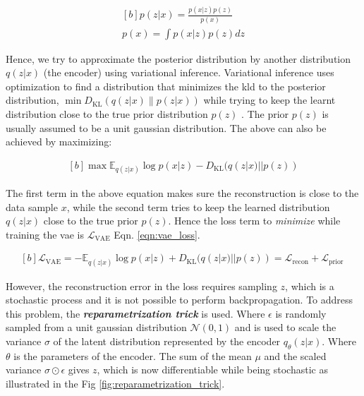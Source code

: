 \begin{equation}\label{eqn:pofx}
    \begin{gathered}[b]
        p(z | x)=\frac{p(x | z) p(z)}{p(x)} \\
        p(x)=\int p(x | z) p(z) dz
    \end{gathered}
\end{equation}

Hence, we try to approximate the posterior distribution by another distribution $q(z|x)$ (the encoder) using variational inference. Variational inference uses optimization to find a distribution that minimizes the \ac{kld} to the posterior distribution, $\min D_{\mathrm{KL}}(q(z| x) \| p(z| x))$ while trying to keep the learnt distribution close to the true prior distribution $p(z)$ \cite{variational_inference}. The prior $p(z)$ is usually assumed to be a unit gaussian distribution. The above can also be achieved by maximizing:

\begin{equation} \label{eqn:minKLd}
    \begin{gathered}[b]
        \max \mathbb{E}_{q(z | x)} \log p(x | z) - D_{\mathrm{KL}}(q(z | x) || p(z))
    \end{gathered}
\end{equation}

The first term in the above equation makes sure the reconstruction is close to the data sample $x$, while the second term tries to keep the learned distribution $q(z|x)$ close to the true prior $p(z)$. Hence the loss term to \textit{minimize} while training the \ac{vae} is $\mathcal{L}_{\mathrm{VAE}}$ Eqn. \ref{eqn:vae_loss}.

\begin{equation} \label{eqn:vae_loss}
    \begin{gathered}[b]
        \mathcal{L}_{\mathrm{VAE}}=-\mathbb{E}_{q(z | x)} \log p(x | z) + D_{\mathrm{KL}}(q(z | x) || p(z)) =\mathcal{L}_{\text {recon}} +\mathcal{L}_{\text {prior }}
    \end{gathered}
\end{equation}

However, the reconstruction error in the loss requires sampling $z$, which is a stochastic process and it is not possible to perform backpropagation. To address this problem, the \textbf{\textit{reparametrization trick}} is used. Where $\epsilon$ is randomly sampled from a unit gaussian distribution $\mathcal{N}(0,1)$ and is used to scale the variance $\sigma$ of the latent distribution represented by the encoder $q_{\theta}(z|x)$. Where $\theta$ is the parameters of the encoder. The sum of the mean $\mu$ and the scaled variance $\sigma \odot \epsilon$ gives $z$, which is now differentiable while being stochastic as illustrated in the Fig \ref{fig:reparametrization_trick}.

